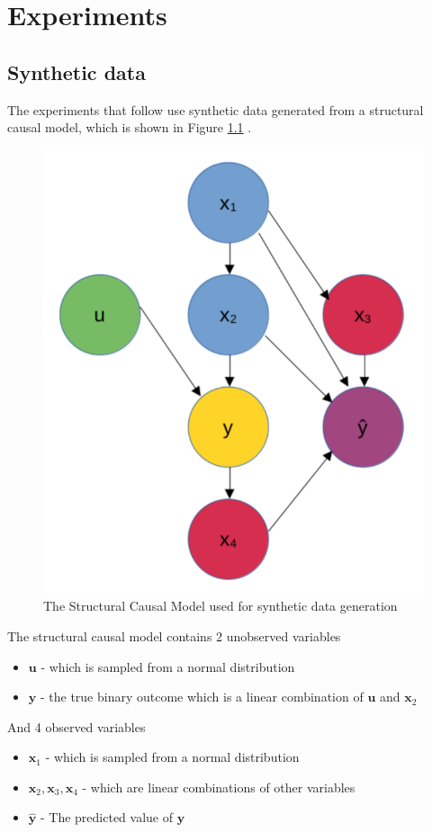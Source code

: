 \chapter{Experiments}

\section{Synthetic data}

The experiments that follow use synthetic data generated from a structural causal model, which is shown in Figure \ref{fig:scm} .

\begin{figure}[!htb]
	\centering
	\includegraphics[width=0.4\linewidth]{images/scm.png}
	\caption{The Structural Causal Model used for synthetic data generation}
	\label{fig:scm}
\end{figure}

The structural causal model contains 2 unobserved variables
\begin{itemize}
	\item $\mathbf{u}$ - which is sampled from a normal distribution
	\item $\mathbf{y}$ - the true binary outcome which is a linear combination of $\mathbf{u}$ and $\mathbf{x}_2$
\end{itemize}

And 4 observed variables
\begin{itemize}
	\item $\mathbf{x}_1$ - which is sampled from a normal distribution
	\item $\mathbf{x}_2,\mathbf{x}_3,\mathbf{x}_4$ - which are linear combinations of other variables
	\item $\hat{\mathbf{y}}$ - The predicted value of $\mathbf{y}$
\end{itemize}


